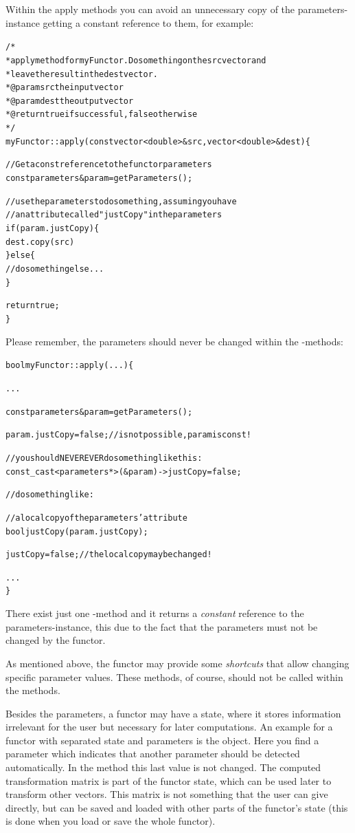 Within the apply methods you can avoid an unnecessary copy of the
parameters-instance getting a constant reference to them, for example:

{\small
\begin{alltt}
/*
 * apply method for myFunctor. Do something on the src vector and
 * leave the result in the dest vector.
 * @param src the input vector
 * @param dest the output vector
 * @return true if successful, false otherwise
 */
 myFunctor::apply(const vector<double>& src, vector<double>& dest) \{
   
   // Get a const reference to the functor parameters
   const parameters\& param = getParameters();

   // use the parameters to do something, assuming you have
   // an attribute called "justCopy" in the parameters
   if (param.justCopy) \{
     dest.copy(src)
   \} else \{
     // do something else ...
   \}

   return true;
 \}
\end{alltt}
}

Please remember, the parameters should never be changed within the
-methods:     

{\small
\begin{alltt}
bool myFunctor::apply(...) \{

  ...

  const parameters& param = getParameters();

  param.justCopy = false;  // is not possible, param is const!
  
  // you should NEVER EVER do something like this:
  const_cast<parameters*>(&param)->justCopy = false;

  // do something like:
  
  // a local copy of the parameters' attribute
  bool justCopy(param.justCopy);

  justCopy = false; // the local copy may be changed!

  ...
\}
\end{alltt}
}

There exist just one -method and it returns a
\emph{constant} reference to the parameters-instance, this due to the fact
that the parameters must not be changed by the functor.

As mentioned above, the functor may provide some \emph{shortcuts}
that allow changing specific parameter values.  These methods, of course,
should not be called within the  methods.

Besides the parameters, a functor may have a state, where it stores
information irrelevant for the user but necessary for later computations.
An example for a functor with separated state and parameters is the
 object.  Here you find a parameter
 which indicates that another parameter
 should be detected automatically.  In the  method
this last value is not changed.  The computed transformation matrix is part of
the functor state, which can be used later to transform other vectors.  This
matrix is not something that the user can give directly, but can be saved and
loaded with other parts of the functor's state (this is done when you
load or save the whole functor).

